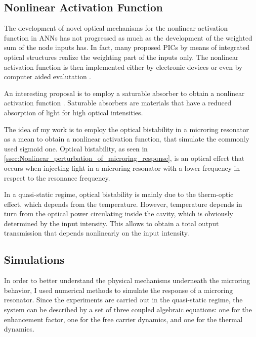 \subsection{Nonlinear Activation Function}
\label{ssec:Nonlinear_Activation_Function}
The development of novel optical mechanisms for the nonlinear activation function in \acsp{ANN} has not progressed as much as the development of the weighted sum of the node inputs has.
In fact, many proposed \acsp{PIC} by means of integrated optical structures realize the weighting part of the inputs only.
The nonlinear activation function is then implemented either by electronic devices \cite{Tait2017} or even by computer aided evalutation \cite{Shen2017}.

An interesting proposal is to employ a saturable absorber to obtain a nonlinear activation function \cite{dejonckheere2014all}.
Saturable absorbers are materials that have a reduced absorption of light for high optical intensities.

The idea of my work is to employ the optical bistability in a microring resonator as a mean to obtain a nonlinear activation function, that simulate the commonly used sigmoid one.
Optical bistability, as seen in \autoref{ssec:Nonlinear_perturbation_of_microring_response}, is an optical effect that occurs when injecting light in a microring resonator with a lower frequency in respect to the resonance frequency.

In a quasi-static regime, optical bistability is mainly due to the therm-optic effect, which depends from the temperature.
However, temperature depends in turn from the optical power circulating inside the cavity, which is obviously determined by the input intensity.
This allows to obtain a total output transmission that depends nonlinearly on the input intensity.

\subsection{Simulations}
\label{ssec:Simulations}
In order to better understand the physical mechanisms underneath the microring behavior, I used numerical methods to simulate the response of a microring resonator.
Since the experiments are carried out in the quasi-static regime, the system can be described by a set of three coupled algebraic equations: one for the enhancement factor, one for the free carrier dynamics, and one for the thermal dynamics.

